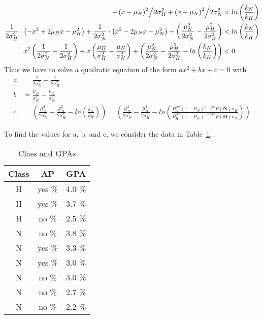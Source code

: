 \documentclass{article}
\begin{document}
\begin{align*}
 {{{ - \left( {x - \mu_H } \right)^2 } \mathord{\left/ {\vphantom {{ - \left( {x - \mu_H } \right)^2 } {2\sigma_{H} ^2 }}} \right. \kern-\nulldelimiterspace} {2\sigma_{H} ^2 }}}+{{{\left( {x - \mu_N } \right)^2 } \mathord{\left/ {\vphantom {{ - \left( {x - \mu_N } \right)^2 } {2\sigma_{N} ^2 }}} \right. \kern-\nulldelimiterspace} {2\sigma_{N} ^2 }}}&< ln\left(\frac{k_N}{k_H}\right)\\
\frac{1}{2\sigma_{H} ^2}\cdot\left(-x^2 + 2\mu_{H}x - \mu_H^2\right) + \frac{1}{2\sigma_{N} ^2}\cdot\left(x^2 - 2\mu_{N}x - \mu_N^2\right) + \left(\frac{\mu_N^2}{2\sigma_N^2} - \frac{\mu_H^2}{2\sigma_H^2}\right)&< ln\left(\frac{k_N}{k_H}\right)\\
x^2\left(\frac{1}{2\sigma_{N} ^2} - \frac{1}{2\sigma_{H} ^2}\right) + x\left(\frac{\mu_H}{\sigma_{H} ^2}- \frac{\mu_N}{\sigma_{N} ^2}\right) +\left(\frac{\mu_N^2}{2\sigma_N^2} - \frac{\mu_H^2}{2\sigma_H^2}- ln\left(\frac{k_N}{k_H}\right)\right)&<0\\
\end{align*}
Thus we have to solve a quadratic equation of the form $ax^2+bx+c=0$ with
\begin{align*}
 a &= \frac{1}{2\sigma_{N} ^2} - \frac{1}{2\sigma_{H} ^2}\\
 b &= \frac{\mu_H}{\sigma_{H} ^2}- \frac{\mu_N}{\sigma_{N} ^2}\\
  c &= \left(\frac{\mu_N^2}{2\sigma_N^2} - \frac{\mu_H^2}{2\sigma_H^2}- ln\left(\frac{k_N}{k_H}\right)\right)= \left(\frac{\mu_N^2}{2\sigma_N^2} - \frac{\mu_H^2}{2\sigma_H^2}- ln\left(\frac{P_N^{\text{yes}} (1-P_N)^{1-\text{yes}}  P(\mathbf{N})\sigma_{H}}{P_H^{\text{yes}} (1-P_H)^{1-\text{yes}}  P(\mathbf{H})\sigma_{N}}\right)\right)
\end{align*}

To find the values for a, b, and c, we consider the data in Table~\ref{tab:p4info}.

\begin{table}[ht]
\centering
\caption{Class and GPAs}\label{tab:p4info}
\begin{tabular}{|c|c|c|}\hline
Class &  AP & GPA \\
\hline
H &    yes \% &    4.0 \%\\   
H &    yes  \%&    3.7 \%\\    
H &    no  \%&    2.5  \%\\   
\hline 
N &    no  \%&    3.8  \%\\   
N &    yes  \%&    3.3  \%\\   
N &    yes  \%&    3.0  \%\\    
N &    no  \%&    3.0  \%\\  
N &    no  \%&    2.7  \%\\   
N &    no  \%&    2.2  \%\\    
\hline
\end{tabular}
\end{table}
\end{document}
